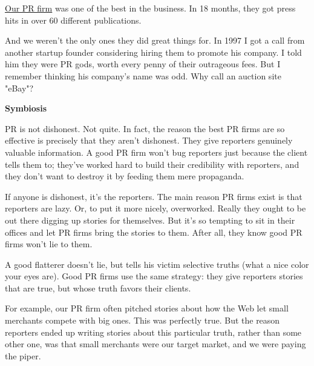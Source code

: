 \href{http://schwartz-pr.com/client\_coverage.php}{Our PR firm}
                  was one of the best in the business. In 18 months, they got
                  press hits in over 60 different publications.
                  
                  And we weren't the only ones they did great things for. In
                  1997 I got a call from another startup founder considering
                  hiring them to promote his company. I told him they were PR
                  gods, worth every penny of their outrageous fees. But I
                  remember thinking his company's name was odd. Why call an
                  auction site "eBay"?


                  \textbf{Symbiosis}

PR is not dishonest. Not quite. In
                  fact, the reason the best PR firms are so effective is
                  precisely that they aren't dishonest. They give reporters
                  genuinely valuable information. A good PR firm won't bug
                  reporters just because the client tells them to; they've
                  worked hard to build their credibility with reporters, and
                  they don't want to destroy it by feeding them mere
                  propaganda.

If anyone is dishonest, it's the
                  reporters. The main reason PR firms exist is that reporters
                  are lazy. Or, to put it more nicely, overworked. Really they
                  ought to be out there digging up stories for themselves. But
                  it's so tempting to sit in their offices and let PR firms
                  bring the stories to them. After all, they know good PR firms
                  won't lie to them.

A good flatterer doesn't lie,
                  but tells his victim selective truths (what a nice color your
                  eyes are). Good PR firms use the same strategy: they give
                  reporters stories that are true, but whose truth favors their
                  clients.

For example, our PR firm often pitched
                  stories about how the Web let small merchants compete with big
                  ones. This was perfectly true. But the reason reporters ended
                  up writing stories about this particular truth, rather than
                  some other one, was that small merchants were our target
                  market, and we were paying the piper.

